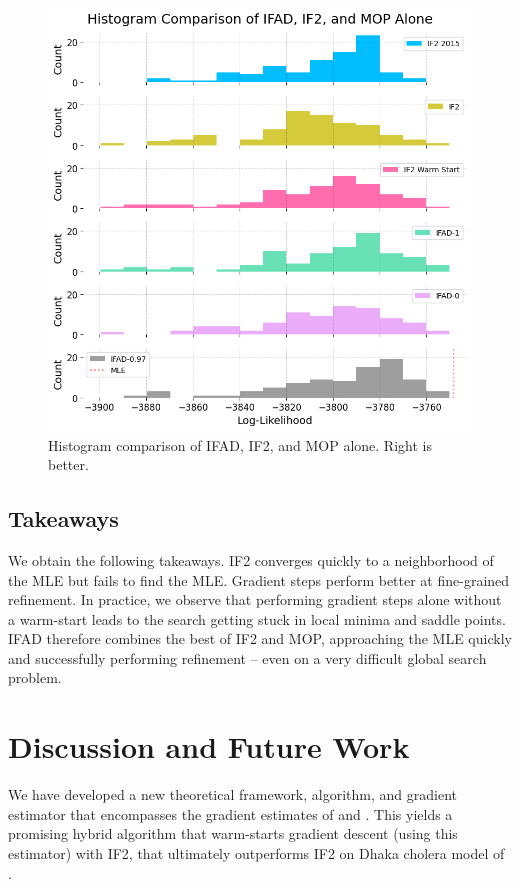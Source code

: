 \documentclass{article}
\begin{document}
\begin{figure}[htbp!]
    \centering
    \includegraphics[scale=0.35]{imgs/095/hist.png}
    \caption{Histogram comparison of IFAD, IF2, and MOP alone. Right is better.}
    \label{fig:hist-all}
\end{figure}

\subsection{Takeaways}

We obtain the following takeaways. IF2 converges quickly to a neighborhood of the MLE but fails to find the MLE. Gradient steps perform better at fine-grained refinement. In practice, we observe that performing gradient steps alone without a warm-start leads to the search getting stuck in local minima and saddle points. IFAD therefore combines the best of IF2 and MOP, approaching the MLE quickly and successfully performing refinement -- even on a very difficult global search problem.

\section{Discussion and Future Work}

We have developed a new theoretical framework, algorithm, and gradient estimator that encompasses the gradient estimates of \cite{blei2018vsmc} and \cite{poyiadjis11}. This yields a promising hybrid algorithm that warm-starts gradient descent (using this estimator) with IF2, that ultimately outperforms IF2 on Dhaka cholera model of \cite{king15}.
\end{document}

